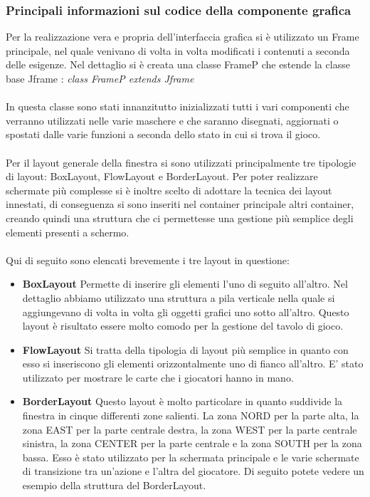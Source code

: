 		\subsubsection{Principali informazioni sul codice della componente grafica}
			Per la realizzazione vera e propria dell'interfaccia grafica si è utilizzato un Frame principale, nel quale venivano di volta in volta modificati i contenuti a seconda delle esigenze. Nel dettaglio si è creata una classe FrameP che estende la classe base Jframe : \textit{class FrameP extends Jframe}\\\\
			
			In questa classe sono stati innanzitutto inizializzati tutti i vari componenti che verranno utilizzati nelle varie maschere e che saranno disegnati, aggiornati o spostati dalle varie funzioni a seconda dello stato in cui si trova il gioco. \\\\
			
			Per il layout generale della finestra si sono utilizzati principalmente tre tipologie di layout: BoxLayout, FlowLayout e BorderLayout. Per poter realizzare schermate più complesse si è inoltre scelto di adottare la tecnica dei layout innestati, di conseguenza si sono inseriti nel container principale altri container, creando quindi una struttura che ci permettesse una gestione più semplice degli elementi presenti a schermo. \\\\
			
			Qui di seguito sono elencati brevemente i tre layout in questione: 
			\begin{itemize}
				\item \textbf{BoxLayout} Permette di inserire gli elementi l’uno di seguito all’altro. Nel dettaglio abbiamo utilizzato una struttura a pila verticale nella quale si aggiungevano di volta in volta gli oggetti grafici uno sotto all’altro. Questo layout è risultato essere molto comodo per la gestione del tavolo di gioco.
				\item \textbf{FlowLayout} Si tratta della tipologia di layout più semplice in quanto con esso si inseriscono gli elementi orizzontalmente uno di fianco all’altro. E’ stato utilizzato per mostrare le carte che i giocatori hanno in mano.
				\item \textbf{BorderLayout} Questo layout è molto particolare in quanto suddivide la finestra in cinque differenti zone salienti. La zona NORD per la parte alta, la zona EAST per la parte centrale destra, la zona WEST per la parte centrale sinistra, la zona CENTER per la parte centrale e la zona SOUTH per la zona bassa. Esso è stato utilizzato per la schermata principale e le varie schermate di transizione tra un’azione e l’altra del giocatore. Di seguito potete vedere un esempio della struttura del BorderLayout.
			\end{itemize}
			
